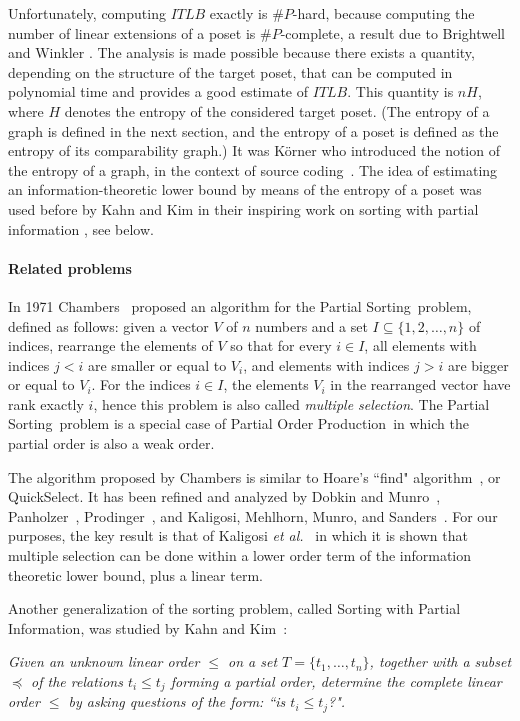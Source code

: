 \documentclass[12pt,oneside]{article}
\newcommand{\partsort}{{\sc Partial Order Production}}
\newcommand{\psort}{{\sc Partial Sorting}}
\newcommand{\sortwpi}{{\sc Sorting with Partial Information}}
\begin{document}
Unfortunately, computing $ITLB$ exactly is $\#P$-hard, because computing the number of linear extensions of a poset is $\#P$-complete, a result due to Brightwell and Winkler \cite{BW91}. The analysis is made possible because there exists a quantity, depending on the structure of the target poset, that can be computed in polynomial time and provides a good estimate of $ITLB$. This quantity is $nH$, where $H$ denotes the entropy of the considered target poset. (The entropy of a graph is defined in the next section, and the entropy of a poset is defined as the entropy of its comparability graph.) It was K\"orner who introduced the notion of the entropy of a graph, in the context of source coding~\cite{K73}. The idea of estimating an information-theoretic lower bound by means of the entropy of a poset was used before by Kahn and Kim in their inspiring work on sorting with partial information \cite{KK95}, see below.

\paragraph{Related problems}
In 1971 Chambers~\cite{C71} proposed an algorithm for the \psort\ problem, defined as follows: given a vector $V$ of $n$ numbers and a set $I\subseteq \{1,2,\ldots ,n\}$ of indices, rearrange the elements of $V$ so that for every $i\in I$, all elements with indices $j<i$ are smaller or equal to $V_i$, and elements with indices $j>i$ are bigger or equal to $V_i$. For the indices $i\in I$, the elements $V_i$ in the rearranged vector have rank exactly $i$, hence this problem is also called {\em multiple selection}. The \psort\ problem is a special case of \partsort\ in which the partial order is also a weak order.

The algorithm proposed by Chambers is similar to Hoare's ``find" algorithm~\cite{H61}, or QuickSelect. It has been refined and analyzed by Dobkin and Munro~\cite{DM81}, Panholzer~\cite{Pa03}, Prodinger~\cite{Pr03}, and Kaligosi, Mehlhorn, Munro, and Sanders~\cite{KMMS05}. For our purposes, the key result is that of Kaligosi {\em et al.\/}~\cite{KMMS05} in which it is shown that multiple selection can be done within a lower order term of the information theoretic lower bound, plus a linear term.\medskip

Another generalization of the sorting problem, called \sortwpi, was studied by Kahn and Kim~\cite{KK95}:\smallskip

{\it Given an unknown linear order $\leqslant$ on a set $T=\{ t_1,\ldots , t_n\}$, together with a subset $\preccurlyeq$ of the relations $t_i \leqslant t_j$ forming a partial order, determine the complete linear order $\leqslant$ by asking questions of the form: ``is $t_i \leqslant t_j$?".}\smallskip
\end{document}
